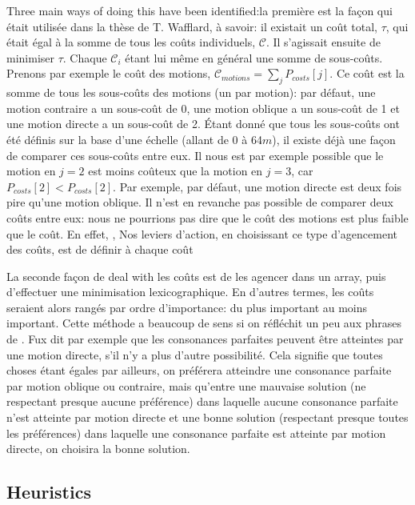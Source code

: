 Three main ways of doing this have been identified:la première est la façon qui était utilisée dans la thèse de T. Wafflard, à savoir: il existait un coût total, $\tau$, qui était égal à la somme de tous les coûts individuels, $\mathcal{C}$. Il s'agissait ensuite de minimiser $\tau$. Chaque $\mathcal{C}_i$ étant lui même en général une somme de sous-coûts. Prenons par exemple le coût des motions, $\mathcal{C}_{motions} = \sum_j P_{costs}[j] $. Ce coût est la somme de tous les sous-coûts des motions (un par motion): par défaut, une motion contraire a un sous-coût de 0, une motion oblique a un sous-coût de 1 et une motion directe a un sous-coût de 2. Étant donné que tous les sous-coûts ont été définis sur la base d'une échelle (allant de 0 à 64$m$), il existe déjà une façon de comparer ces sous-coûts entre eux. Il nous est par exemple possible que le motion en $j=2$ est moins coûteux que la motion en $j=3$, car $P_{costs}[2] < P_{costs}[2]$. Par exemple, par défaut, une motion directe est deux fois pire qu'une motion oblique. Il n'est en revanche pas possible de comparer deux coûts entre eux: nous ne pourrions pas dire que le coût des motions est plus faible que le coût. En effet, ,  Nos leviers d'action, en choisissant ce type d'agencement des coûts, est de définir à chaque coût 

La seconde façon de deal with les coûts est de les agencer dans un array, puis d'effectuer une minimisation lexicographique. En d'autres termes, les coûts seraient alors rangés par ordre d'importance: du plus important au moins important. Cette méthode a beaucoup de sens si on réfléchit un peu aux phrases de \gap. Fux dit par exemple que les consonances parfaites peuvent être atteintes par une motion directe, s'il n'y a plus d'autre possibilité. Cela signifie que toutes choses étant égales par ailleurs, on préférera atteindre une consonance parfaite par motion oblique ou contraire, mais qu'entre une mauvaise solution (ne respectant presque aucune préférence) dans laquelle aucune consonance parfaite n'est atteinte par motion directe et une bonne solution (respectant presque toutes les préférences) dans laquelle une consonance parfaite est atteinte par motion directe, on choisira la bonne solution. 

\subsection{Heuristics}